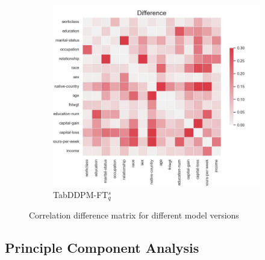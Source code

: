 \begin{figure}[h]
\begin{subfigure}{0.3\textwidth}
    \end{subfigure}
	\begin{subfigure}{0.3\textwidth}
		\includegraphics[width=\textwidth]{images/correlation_difference/tab-ddpm-ft-simTune.jpg}
		\caption{TabDDPM-FT$^{s}_q$}

    \end{subfigure}
    \caption{Correlation difference matrix for different model versions}

\end{figure}

\subsection[]{Principle Component Analysis}
\label{A:pca}

